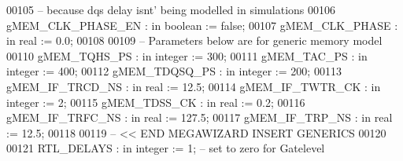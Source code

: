 \begin{DoxyCode}
00105 \textcolor{keyword}{        -- because dqs delay isnt' being modelled in simulations}
00106         \textcolor{vhdlchar}{gMEM_CLK_PHASE_EN}       \textcolor{vhdlchar}{:} \textcolor{keywordflow}{in} \textcolor{comment}{boolean} \textcolor{vhdlchar}{:=} \textcolor{vhdlchar}{false};
00107         \textcolor{vhdlchar}{gMEM_CLK_PHASE}          \textcolor{vhdlchar}{:} \textcolor{keywordflow}{in} \textcolor{comment}{real}    \textcolor{vhdlchar}{:=} \textcolor{vhdllogic}{}\textcolor{vhdllogic}{0}.\textcolor{vhdllogic}{0};
00108         
00109 \textcolor{keyword}{        -- Parameters below are for generic memory model}
00110         \textcolor{vhdlchar}{gMEM_TQHS_PS}        \textcolor{vhdlchar}{:} \textcolor{keywordflow}{in} \textcolor{comment}{integer} \textcolor{vhdlchar}{:=} \textcolor{vhdllogic}{}\textcolor{vhdllogic}{300};
00111         \textcolor{vhdlchar}{gMEM_TAC_PS}     \textcolor{vhdlchar}{:} \textcolor{keywordflow}{in} \textcolor{comment}{integer} \textcolor{vhdlchar}{:=} \textcolor{vhdllogic}{}\textcolor{vhdllogic}{400};
00112         \textcolor{vhdlchar}{gMEM_TDQSQ_PS}       \textcolor{vhdlchar}{:} \textcolor{keywordflow}{in} \textcolor{comment}{integer} \textcolor{vhdlchar}{:=} \textcolor{vhdllogic}{}\textcolor{vhdllogic}{200};
00113         \textcolor{vhdlchar}{gMEM_IF_TRCD_NS}     \textcolor{vhdlchar}{:} \textcolor{keywordflow}{in} \textcolor{comment}{real} \textcolor{vhdlchar}{:=} \textcolor{vhdllogic}{}\textcolor{vhdllogic}{12}.\textcolor{vhdllogic}{5};
00114         \textcolor{vhdlchar}{gMEM_IF_TWTR_CK}     \textcolor{vhdlchar}{:} \textcolor{keywordflow}{in} \textcolor{comment}{integer} \textcolor{vhdlchar}{:=} \textcolor{vhdllogic}{}\textcolor{vhdllogic}{2};
00115         \textcolor{vhdlchar}{gMEM_TDSS_CK}        \textcolor{vhdlchar}{:} \textcolor{keywordflow}{in} \textcolor{comment}{real} \textcolor{vhdlchar}{:=} \textcolor{vhdllogic}{}\textcolor{vhdllogic}{0}.\textcolor{vhdllogic}{2};
00116         \textcolor{vhdlchar}{gMEM_IF_TRFC_NS}     \textcolor{vhdlchar}{:} \textcolor{keywordflow}{in} \textcolor{comment}{real} \textcolor{vhdlchar}{:=} \textcolor{vhdllogic}{}\textcolor{vhdllogic}{127}.\textcolor{vhdllogic}{5};
00117         \textcolor{vhdlchar}{gMEM_IF_TRP_NS}      \textcolor{vhdlchar}{:} \textcolor{keywordflow}{in} \textcolor{comment}{real} \textcolor{vhdlchar}{:=} \textcolor{vhdllogic}{}\textcolor{vhdllogic}{12}.\textcolor{vhdllogic}{5};
00118     
00119 \textcolor{keyword}{-- << END MEGAWIZARD INSERT GENERICS}
00120 
00121         \textcolor{vhdlchar}{RTL_DELAYS}             \textcolor{vhdlchar}{:} \textcolor{keywordflow}{in} \textcolor{comment}{integer} \textcolor{vhdlchar}{:=} \textcolor{vhdllogic}{}\textcolor{vhdllogic}{1};\textcolor{keyword}{  -- set to zero for Gatelevel}

\end{DoxyCode}
